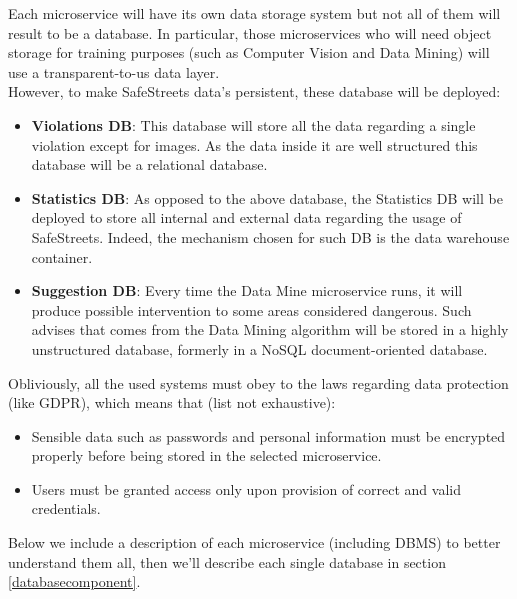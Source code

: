Each microservice will have its own data storage system but not all of them will result to be a database. In particular, those microservices who will need object storage for training purposes (such as Computer Vision and Data Mining) will use a transparent-to-us data layer.\\
However, to make SafeStreets data's persistent, these database will be deployed:
\begin{itemize}
	\item \textbf{Violations DB}: This database will store all the data regarding a single violation except for images. As the data inside it are well structured this database will be a relational database.
	\item \textbf{Statistics DB}: As opposed to the above database, the Statistics DB will be deployed to store all internal and external data regarding the usage of SafeStreets. Indeed, the mechanism chosen for such DB is the data warehouse container.
	\item \textbf{Suggestion DB}: Every time the Data Mine microservice runs, it will produce possible intervention to some areas considered dangerous. Such advises that comes from the Data Mining algorithm will be stored in a highly unstructured database, formerly in a NoSQL document-oriented database.
\end{itemize}
Obliviously, all the used systems must obey to the laws regarding data protection (like GDPR), which means that (list not exhaustive):
\begin{itemize}
\item Sensible data such as passwords and personal information must be encrypted properly before being stored in the selected microservice.
\item Users must be granted access only upon provision of correct and valid credentials.
\end{itemize}

Below we include a description of each microservice (including DBMS) to better understand them all, then we'll describe each single database in section \ref{databasecomponent}.